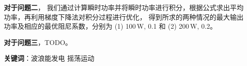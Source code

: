 \textbf{对于问题二}，
我们通过计算瞬时功率并将瞬时功率进行积分，根据公式求出平均功率，再利用梯度下降法对积分过程进行优化，
得到所求的两种情况的最大输出功率及相应的最优阻尼系数，分别为 (1) 100\,W, 0.1 和 (2) 200\,W, 0.2。

\textbf{对于问题三}，TODO。

\vfill

\textbf{关键词}：波浪能发电 \hspace{1em} 摇荡运动 \hspace{1em}